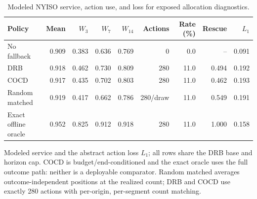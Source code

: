 
\begin{table}[!tbp]
\centering
\caption{Modeled NYISO service, action use, and loss for exposed
allocation diagnostics.}
\label{tab:nyiso-policies}
\scriptsize
\setlength{\tabcolsep}{2.7pt}
\begin{tabular}{lrrrrrrrr}
\toprule
Policy & Mean & $W_3$ & $W_7$ & $W_{14}$ & Actions & Rate (\%) & Rescue & $L_1$ \\
\midrule
No fallback & 0.909 & 0.383 & 0.636 & 0.769 & 0 & 0.0 & -- & 0.091 \\
DRB & 0.918 & 0.462 & 0.730 & 0.809 & 280 & 11.0 & 0.494 & 0.192 \\
COCD & 0.917 & 0.435 & 0.702 & 0.803 & 280 & 11.0 & 0.462 & 0.193 \\
Random matched & 0.919 & 0.417 & 0.662 & 0.786 & 280/draw & 11.0 & 0.549 & 0.191 \\
Exact offline oracle & 0.952 & 0.825 & 0.912 & 0.918 & 280 & 11.0 & 1.000 & 0.158 \\
\bottomrule
\end{tabular}
\par\footnotesize Modeled service and the abstract action loss $L_1$; all rows
share the DRB base and horizon cap. COCD is budget/end-conditioned and the
exact oracle uses the full outcome path: neither is a deployable comparator.
Random matched averages outcome-independent positions at the realized count;
DRB and COCD use exactly 280 actions with per-origin, per-segment count
matching.
\end{table}
